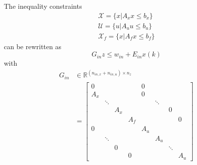 The inequality constraints
\begin{gather*}
    \mathcal{X} = \{x|A_x x \leq b_x\} \\
    \mathcal{U} = \{u|A_u u \leq b_u\} \\
    \mathcal{X}_f = \{x|A_f x \leq b_f\}
\end{gather*}
can be rewritten as
\begin{equation*}
    G_{in} z \leq w_{in} + E_{in} x(k)
\end{equation*}
with
\begin{align*}
    G_{in} & \in \mathbb{R}^{(n_{in,x}+n_{in,u})\times n_z} \\
           & =\left[
        \begin{array}{cccc|cccc} %
            0   &        &     &     & 0   &        &        &     \\
            \hline %
            A_x &        &     &     & 0   &        &        &     \\
                & \ddots &     &     &     & \ddots &        &     \\
                &        & A_x &     &     &        & 0      &     \\
                &        &     & A_f &     &        &        & 0   \\
            \hline %
            0   &        &     &     & A_u &        &        &     \\
                & \ddots &     &     &     & A_u    &        &     \\
                &        & 0   &     &     &        & \ddots &     \\
                &        &     & 0   &     &        &        & A_u
        \end{array}
    \right]                                                 \\
\end{align*}
